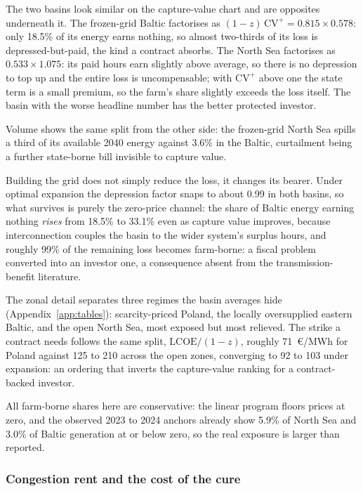 The two basins look similar on the capture-value chart and are opposites
underneath it. The frozen-grid Baltic factorises as
$(1-z)\,\mathrm{CV}^{+} = 0.815 \times 0.578$:
only 18.5\% of its energy earns nothing, so almost two-thirds of its loss is
depressed-but-paid, the kind a contract absorbs. The North Sea factorises as
$0.533 \times 1.075$: its paid hours earn slightly above average, so there is
no depression to top up and the entire loss is uncompensable; with
$\mathrm{CV}^{+}$ above one the state term is a small premium, so the farm's share slightly exceeds the loss itself. The basin with the worse
headline number has the better protected investor.

Volume shows the same split from the other side: the frozen-grid North Sea
spills a third of its available 2040 energy against 3.6\% in the Baltic,
curtailment being a further state-borne bill invisible to capture value.

Building the grid does not simply reduce the loss, it changes its bearer.
Under optimal expansion the depression factor snaps to about 0.99 in both
basins, so what survives is purely the zero-price channel: the share of Baltic
energy earning nothing \emph{rises} from 18.5\% to 33.1\% even as capture
value improves, because interconnection couples the basin to the wider
system's surplus hours, and roughly 99\% of the remaining loss becomes
farm-borne: a fiscal problem converted into an investor one, a consequence
absent from the transmission-benefit literature.

The zonal detail separates three regimes the basin averages hide
(Appendix~\ref{app:tables}): scarcity-priced Poland, the locally oversupplied
eastern Baltic, and the open North Sea, most exposed but most relieved. The
strike a contract needs follows the same split, $\mathrm{LCOE}/(1-z)$,
roughly 71~\euro/MWh for Poland against 125 to 210 across the open zones,
converging to 92 to 103 under expansion: an ordering that inverts the
capture-value ranking for a contract-backed investor.

All farm-borne shares here are conservative: the linear program floors prices
at zero, and the observed 2023 to 2024 anchors already show 5.9\% of North
Sea and 3.0\% of Baltic generation at or below zero, so the real exposure is
larger than reported.

\subsubsection{Congestion rent and the cost of the cure}\label{sec:rent_results}

